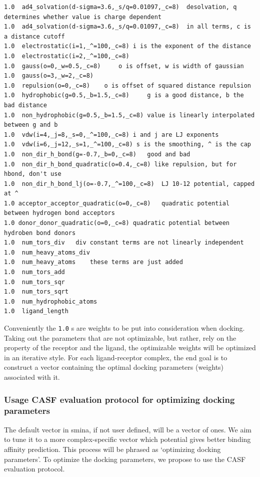 \begin{lstlisting}[language={},caption = smina user defined parameters, frame=single, label = smina]
1.0  ad4_solvation(d-sigma=3.6,_s/q=0.01097,_c=8)  desolvation, q determines whether value is charge dependent
1.0  ad4_solvation(d-sigma=3.6,_s/q=0.01097,_c=8)  in all terms, c is a distance cutoff
1.0  electrostatic(i=1,_^=100,_c=8)	i is the exponent of the distance
1.0  electrostatic(i=2,_^=100,_c=8)
1.0  gauss(o=0,_w=0.5,_c=8)		o is offset, w is width of gaussian
1.0  gauss(o=3,_w=2,_c=8)
1.0  repulsion(o=0,_c=8)	o is offset of squared distance repulsion
1.0  hydrophobic(g=0.5,_b=1.5,_c=8)		g is a good distance, b the bad distance
1.0  non_hydrophobic(g=0.5,_b=1.5,_c=8)	value is linearly interpolated between g and b
1.0  vdw(i=4,_j=8,_s=0,_^=100,_c=8)	i and j are LJ exponents
1.0  vdw(i=6,_j=12,_s=1,_^=100,_c=8) s is the smoothing, ^ is the cap
1.0  non_dir_h_bond(g=-0.7,_b=0,_c=8)	good and bad
1.0  non_dir_h_bond_quadratic(o=0.4,_c=8) like repulsion, but for hbond, don't use	
1.0  non_dir_h_bond_lj(o=-0.7,_^=100,_c=8)	LJ 10-12 potential, capped at ^
1.0 acceptor_acceptor_quadratic(o=0,_c=8)	quadratic potential between hydrogen bond acceptors
1.0 donor_donor_quadratic(o=0,_c=8)	quadratic potential between hydroben bond donors
1.0  num_tors_div	div constant terms are not linearly independent
1.0  num_heavy_atoms_div	
1.0  num_heavy_atoms	these terms are just added
1.0  num_tors_add
1.0  num_tors_sqr
1.0  num_tors_sqrt
1.0  num_hydrophobic_atoms
1.0  ligand_length
\end{lstlisting}

Conveniently the \texttt{1.0} s are weights to be put into consideration when docking. 
Taking out the parameters that are not optimizable, but rather, rely on the property of the receptor and the ligand, the optimizable weights will be optimized in an iterative style.
For each ligand-receptor complex, the end goal is to construct a vector containing the optimal docking parameters (weights) associated with it.

\subsubsection{Usage CASF evaluation protocol for optimizing docking parameters} \label{CASF}

The default vector in smina, if not user defined, will be a vector of ones. 
We aim to tune it to a more complex-specific vector which potential gives better binding affinity prediction. This process will be phrased as `optimizing docking parameters'.
To optimize the docking parameters, we propose to use the CASF evaluation protocol.


